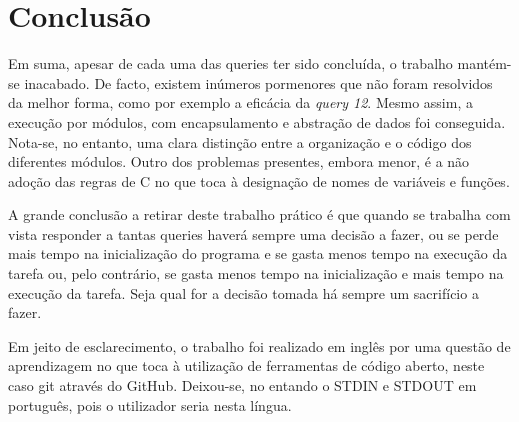 \documentclass[10pt] {article}
\begin{document}
\newpage
\section{Conclusão}

\indent\par Em suma, apesar de cada uma das queries ter sido concluída, o trabalho mantém-se inacabado. De
facto, existem inúmeros pormenores que não foram resolvidos da melhor forma, como por exemplo a
eficácia da \emph{query 12}. Mesmo assim, a execução por módulos, com encapsulamento e abstração de dados
foi conseguida. Nota-se, no entanto, uma clara distinção entre a organização e o código dos diferentes módulos.
Outro dos problemas presentes, embora menor, é a não adoção das regras de C no que toca à designação de
nomes de variáveis e funções.
\par A grande conclusão a retirar deste trabalho prático é que quando se trabalha com vista responder a tantas
queries haverá sempre uma decisão a fazer, ou se perde mais tempo na inicialização do programa e se gasta
menos tempo na execução da tarefa ou, pelo contrário, se gasta menos tempo na inicialização e mais tempo na
execução da tarefa. Seja qual for a decisão tomada há sempre um sacrifício a fazer.
\par Em jeito de esclarecimento, o trabalho foi realizado em inglês por uma questão de aprendizagem no que toca à
utilização de ferramentas de código aberto, neste caso git através do GitHub. Deixou-se, no entando o STDIN e
STDOUT em português, pois o utilizador seria nesta língua.
\end{document}
